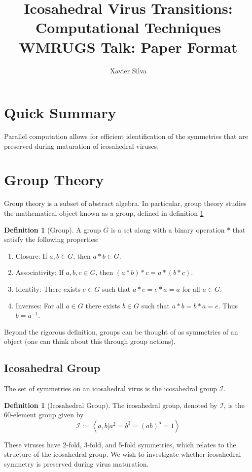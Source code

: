 \documentclass[a4paper,10pt]{article}
\title{Icosahedral Virus Transitions: Computational Techniques \\ \large WMRUGS Talk: Paper Format}
\author{Xavier Silva}
\theoremstyle{plain}
\theoremstyle{definition}
\newtheorem{Definition}[Theorem]{Definition}
\theoremstyle{remark}
\newcommand{\generatedby}[1]{\left\langle#1\right\rangle}
\begin{document}
\maketitle
\tableofcontents

\section{Quick Summary}
Parallel computation allows for efficient identification of the symmetries that are preserved during maturation of icosahedral viruses.

\section{Group Theory}
Group theory is a subset of abstract algebra.
In particular, group theory studies the mathematical object known as a group, defined in definition \ref{def:group}
\begin{Definition}[Group]
    \label{def:group}
    A group \(G\) is a set along with a binary operation \(*\) that satisfy the following properties:
    \begin{enumerate}
        \item Closure: If \(a, b \in G\), then \(a*b \in G\).
        \item Associativity: If \(a, b, c \in G\), then \((a*b)*c = a*(b*c)\).
        \item Identity: There exists \(e \in G\) such that \(a*e = e*a = a\) for all \(a \in G\).
        \item Inverses: For all \(a \in G\) there exists \(b \in G\) such that \(a*b = b*a = e\). Thus \(b = a^{-1}\).
    \end{enumerate}
\end{Definition}
Beyond the rigorous definition, groups can be thought of as symmetries of an object (one can think about this through group actions).

\subsection{Icosahedral Group}
The set of symmetries on an icosahedral virus is the icosahedral group \(\mathcal{I}\).
\begin{Definition}[Icosahedral Group]
    The icosahedral group, denoted by \(\mathcal{I}\), is the 60-element group given by \[\mathcal{I} := \generatedby{a, b | a^2 = b^3 = (ab)^5 = 1}\]
\end{Definition}
These viruses have 2-fold, 3-fold, and 5-fold symmetries, which relates to the structure of the icosahedral group.
We wish to investigate whether icosahedral symmetry is preserved during virus maturation.
\end{document}
